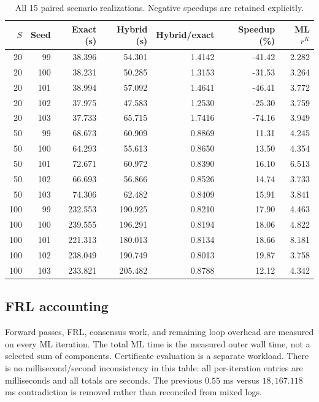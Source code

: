 \documentclass[preprint,12pt,3p]{elsarticle}
\theoremstyle{definition}
\begin{document}
\begin{table}[htbp]
\centering
\caption{All 15 paired scenario realizations. Negative speedups are retained explicitly.}
\label{tab:robustness}
\small
\begin{tabular}{rrrrrrr}
\toprule
$S$ & Seed & Exact (s) & Hybrid (s) & Hybrid/exact & Speedup (\%) & ML $r^K$ \\
\midrule
20 & 99 & 38.396 & 54.301 & 1.4142 & -41.42 & 2.282 \\
\midrule
20 & 100 & 38.231 & 50.285 & 1.3153 & -31.53 & 3.264 \\
\midrule
20 & 101 & 38.994 & 57.092 & 1.4641 & -46.41 & 3.772 \\
\midrule
20 & 102 & 37.975 & 47.583 & 1.2530 & -25.30 & 3.759 \\
\midrule
20 & 103 & 37.733 & 65.715 & 1.7416 & -74.16 & 3.949 \\
50 & 99 & 68.673 & 60.909 & 0.8869 & 11.31 & 4.245 \\
\midrule
50 & 100 & 64.293 & 55.613 & 0.8650 & 13.50 & 4.354 \\
\midrule
50 & 101 & 72.671 & 60.972 & 0.8390 & 16.10 & 6.513 \\
\midrule
50 & 102 & 66.693 & 56.866 & 0.8526 & 14.74 & 3.733 \\
\midrule
50 & 103 & 74.306 & 62.482 & 0.8409 & 15.91 & 3.841 \\
100 & 99 & 232.553 & 190.925 & 0.8210 & 17.90 & 4.463 \\
\midrule
100 & 100 & 239.555 & 196.291 & 0.8194 & 18.06 & 4.822 \\
\midrule
100 & 101 & 221.313 & 180.013 & 0.8134 & 18.66 & 8.181 \\
\midrule
100 & 102 & 238.049 & 190.749 & 0.8013 & 19.87 & 3.758 \\
\midrule
100 & 103 & 233.821 & 205.482 & 0.8788 & 12.12 & 4.342 \\
\bottomrule
\end{tabular}
\end{table}

\subsection{FRL accounting}
Forward passes, FRL, consensus work, and remaining loop overhead are measured on every ML iteration. The total ML time is the measured outer wall time, not a selected sum of components. Certificate evaluation is a separate workload. There is no millisecond/second inconsistency in this table: all per-iteration entries are milliseconds and all totals are seconds. The previous $0.55$ ms versus $18{,}167.118$ ms contradiction is removed rather than reconciled from mixed logs.
\end{document}
